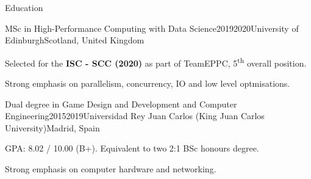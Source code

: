\documentclass{resume} %
\begin{document}
\begin{mainSection}{Education}

\begin{educationItem}
{MSc in High-Performance Computing with Data Science}{2019}{2020}{University of Edinburgh}{Scotland, United Kingdom}

Selected for the \textbf{ISC - SCC (2020)} as part of TeamEPPC, 5\textsuperscript{th} overall position.%

Strong emphasis on parallelism, concurrency, IO and low level optmisations.
\end{educationItem}

\begin{educationItem}
{Dual degree in Game Design and Development and Computer Engineering}{2015}{2019}{Universidad Rey Juan Carlos (King Juan Carlos University)}{Madrid, Spain}

GPA: 8.02 / 10.00 (B+). Equivalent to two 2:1 BSc honours degree.

Strong emphasis on computer hardware and networking.
\end{educationItem}

\end{mainSection}




\end{document}
